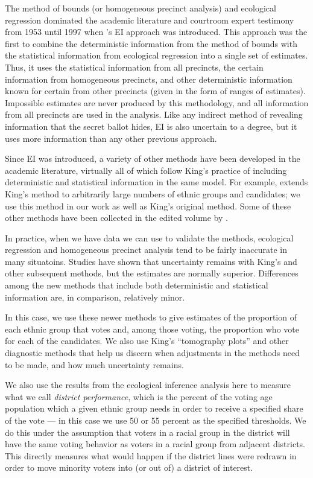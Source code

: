 \documentclass[12pt]{scrartcl}
\begin{document}
The method of bounds (or homogeneous precinct analysis) and ecological
regression dominated the academic literature and courtroom expert
testimony from 1953 until 1997 when \citeauthor{king1997}'s EI
approach was introduced. This approach was the first to combine the
deterministic information from the method of bounds with the
statistical information from ecological regression into a single set
of estimates. Thus, it uses the statistical information from all
precincts, the certain information from homogeneous precincts, and
other deterministic information known for certain from other precincts
(given in the form of ranges of estimates).  Impossible estimates are
never produced by this methodology, and all information from all
precincts are used in the analysis. Like any indirect method of
revealing information that the secret ballot hides, EI is also
uncertain to a degree, but it uses more information than any other
previous approach. 

Since EI was introduced, a variety of other methods have been
developed in the academic literature, virtually all of which follow
King's practice of including deterministic and statistical information
in the same model.  For example, \citet{king2001} extends King's
method to arbitrarily large numbers of ethnic groups and candidates;
we use this method in our work as well as King's original method. Some
of these other methods have been collected in the edited volume by
\citet{king2004}.

In practice, when we have data we can use to validate the methods,
ecological regression and homogeneous precinct analysis tend to be
fairly inaccurate in many situatoins. Studies have shown that
uncertainty remains with King's and other subsequent methods, but the
estimates are normally superior. Differences among the new methods
that include both deterministic and statistical information are, in
comparison, relatively minor.

In this case, we use these newer methods to give estimates of the
proportion of each ethnic group that votes and, among those voting,
the proportion who vote for each of the candidates. We also use King's
``tomography plots'' and other diagnostic methods that help us discern
when adjustments in the methods need to be made, and how much
uncertainty remains.  

We also use the results from the ecological inference analysis here to
measure what we call \emph{district performance}, which is the percent
of the voting age population which a given ethnic group needs in order
to receive a specified share of the vote --- in this case we use 50 or
55 percent as the specified thresholds. We do this under the
assumption that voters in a racial group in the district will have the
same voting behavior as voters in a racial group from adjacent
districts.  This directly measures what would happen if the district
lines were redrawn in order to move minority voters into (or out of) a
district of interest.
\end{document}

